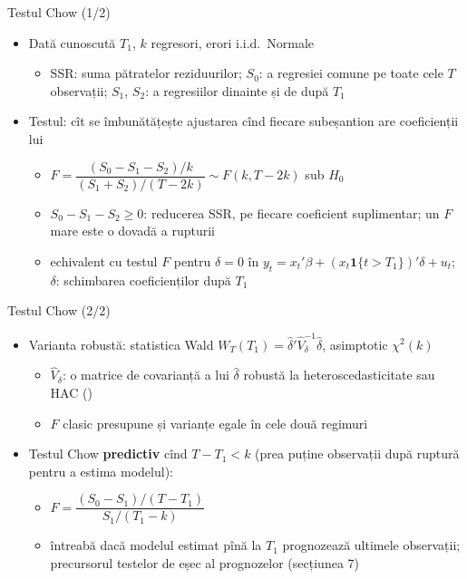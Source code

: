 \begin{frame}{Testul Chow (1/2)}
\itemsize{\small}
\begin{itemize}
    \item Dată cunoscută $T_1$, $k$ regresori, erori i.i.d.\ Normale 
    \begin{itemize}
        \item SSR: suma pătratelor reziduurilor; $S_0$: a regresiei comune pe toate cele $T$ observații; $S_1$, $S_2$: a regresiilor dinainte și de după $T_1$
    \end{itemize}
    \item Testul: cît se îmbunătățește ajustarea cînd fiecare subeșantion are coeficienții lui
    \begin{itemize}
        \item $F = \dfrac{(S_0 - S_1 - S_2)/k}{(S_1 + S_2)/(T - 2k)} \sim F(k, T - 2k)$ sub $H_0$
        \item $S_0 - S_1 - S_2 \ge 0$: reducerea SSR, pe fiecare coeficient suplimentar; un $F$ mare este o dovadă a rupturii
        \item echivalent cu testul $F$ pentru $\delta = 0$ în $y_t = x_t'\beta + (x_t \mathbf 1\{t > T_1\})'\delta + u_t$; $\delta$: schimbarea coeficienților după $T_1$
    \end{itemize}
\end{itemize}
\end{frame}

\begin{frame}{Testul Chow (2/2)}
\itemsize{\small}
\begin{itemize}
    \item Varianta robustă: statistica Wald $W_T(T_1) = \hat\delta'\hat V_\delta^{-1}\hat\delta$, asimptotic $\chi^2(k)$
    \begin{itemize}
        \item $\hat V_\delta$: o matrice de covarianță a lui $\hat\delta$ robustă la heteroscedasticitate sau HAC ()
        \item $F$ clasic presupune și varianțe egale în cele două regimuri
    \end{itemize}
    \item Testul Chow \textbf{predictiv} cînd $T - T_1 < k$ (prea puține observații după ruptură pentru a estima modelul):
    \begin{itemize}
        \item $F = \dfrac{(S_0 - S_1)/(T - T_1)}{S_1/(T_1 - k)}$
        \item întreabă dacă modelul estimat pînă la $T_1$ prognozează ultimele observații; precursorul testelor de eșec al prognozelor (secțiunea 7)
    \end{itemize}
\end{itemize}
\end{frame}

